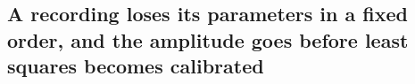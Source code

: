 \subsection*{A recording loses its parameters in a fixed order, and the amplitude goes before least squares becomes calibrated}
